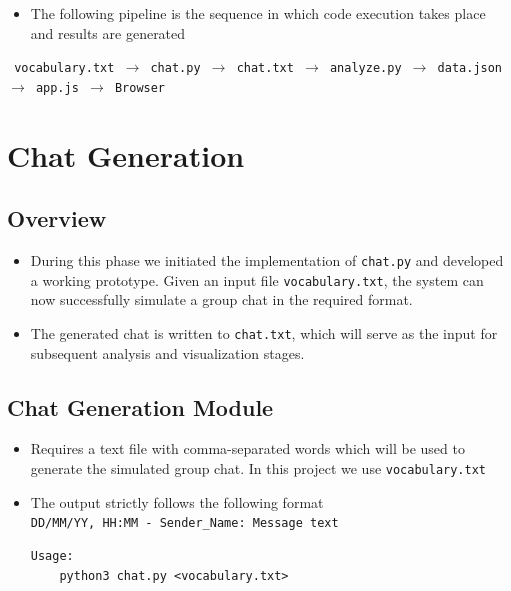 \documentclass[11pt,a4paper]{article}
\begin{document}
\begin{itemize}
\item The following pipeline is the sequence in which code execution takes place and results are generated
\end{itemize}

\begin{center}
\texttt{
vocabulary.txt $\rightarrow$ chat.py $\rightarrow$ chat.txt $\rightarrow$ analyze.py $\rightarrow$ data.json $\rightarrow$ app.js $\rightarrow$ Browser
}
\end{center}
\newpage






























\section{Chat Generation}
\subsection{Overview}
\begin{itemize}
\item During this phase we initiated the implementation of \texttt{chat.py} and developed a working prototype. Given an input file \texttt{vocabulary.txt}, the system can now successfully simulate a group chat in the required format.
\item The generated chat is written to \texttt{chat.txt}, which will serve as the input for subsequent analysis and visualization stages.
\end{itemize}
\subsection{Chat Generation Module}
\begin{itemize}
\item Requires a text file with comma-separated words which will be used to generate the simulated group chat. In this project we use \texttt{vocabulary.txt} 
\item The output strictly follows the following format\cite{whatsappformat}\\ 
\texttt{DD/MM/YY, HH:MM - Sender\_Name: Message text}

\begin{verbatim}
Usage:
    python3 chat.py <vocabulary.txt>
\end{verbatim}
\end{itemize}
\end{document}
